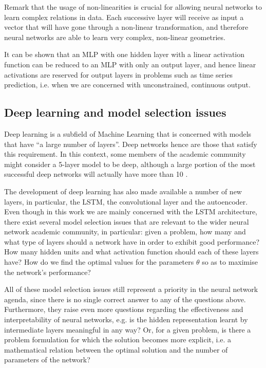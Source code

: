 \documentclass[pdftex,12pt,a4paper]{article}
\theoremstyle{definition}
\theoremstyle{remark}
\begin{document}
\par Remark that the usage of non-linearities is crucial for allowing neural networks to learn complex relations in data. Each successive layer will receive as input a vector that will have gone through a non-linear transformation, and therefore neural networks are able to learn very complex, non-linear geometries.

\par It can be shown that an MLP with one hidden layer with a linear activation function can be reduced to an MLP with only an output layer, and hence linear activations are reserved for output layers in problems such as time series prediction, i.e. when we are concerned with unconstrained, continuous output.

\subsection{Deep learning and model selection issues}
\par Deep learning is a subfield of Machine Learning that is concerned with models that have ``a large number of layers''. Deep networks hence are those that satisfy this requirement. In this context, some members of the academic community might consider a 5-layer model to be deep, although a large portion of the most successful deep networks will actually have more than 10 \cite{Szegedy,Simonyan2015}.

\par The development of deep learning has also made available a number of new layers, in particular, the LSTM, the convolutional layer and the autoencoder. Even though in this work we are mainly concerned with the LSTM architecture, there exist several model selection issues that are relevant to the wider neural network academic community, in particular: given a problem, how many and what type of layers should a network have in order to exhibit good performance? How many hidden units and what activation function should each of these layers have? How do we find the optimal values for the parameters $\theta$ so as to maximise the network's performance?

\par All of these model selection issues still represent a priority in the neural network agenda, since there is no single correct answer to any of the questions above. Furthermore, they raise even more questions regarding the effectiveness and interpretability of neural networks, e.g. is the hidden representation learnt by intermediate layers meaningful in any way? Or, for a given problem, is there a problem formulation for which the solution becomes more explicit, i.e. a mathematical relation between the optimal solution and the number of parameters of the network?
\end{document}
